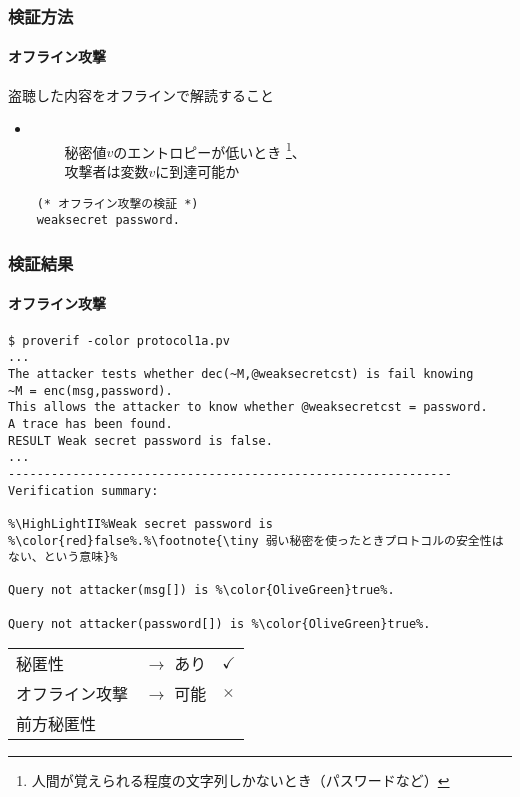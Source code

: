 \documentclass[dvipdfmx, dvipsnames, 11pt]{beamer}
\newcommand{\code}[1]{ \texttt{\detokenize{#1}} }
\newcommand{\HighLight}{\makebox[0pt][l]{\color[rgb]{1, 0.88, 0.66}\rule[-2pt]{1.0\linewidth}{8pt}}}
\newcommand{\HighLightII}{\only<2>{\HighLight}}
\begin{document}
\begin{frame}[fragile]
  \frametitle{検証方法}
  \framesubtitle{オフライン攻撃}

  盗聴した内容をオフラインで解読すること

  \vspace{2em}
  \begin{itemize}
    \item \code{weaksecret v.}
      \\~~~~ 秘密値$v$のエントロピーが低いとき
      \footnote{\tiny 人間が覚えられる程度の文字列しかないとき（パスワードなど）}、
      \\~~~~ 攻撃者は変数$v$に到達可能か
  \end{itemize}

  \vspace{2em}
  \begin{lstlisting}
    (* オフライン攻撃の検証 *)
    weaksecret password.
  \end{lstlisting}
\end{frame}

\begin{frame}[fragile]
  \frametitle{検証結果}
  \framesubtitle{オフライン攻撃}

  \begin{lstlisting}[basicstyle=\ttfamily\tiny, frame=single]
$ proverif -color protocol1a.pv
...
The attacker tests whether dec(~M,@weaksecretcst) is fail knowing
~M = enc(msg,password).
This allows the attacker to know whether @weaksecretcst = password.
A trace has been found.
RESULT Weak secret password is false.
...
--------------------------------------------------------------
Verification summary:

%\HighLightII%Weak secret password is %\color{red}false%.%\footnote{\tiny 弱い秘密を使ったときプロトコルの安全性はない、という意味}%

Query not attacker(msg[]) is %\color{OliveGreen}true%.

Query not attacker(password[]) is %\color{OliveGreen}true%.
  \end{lstlisting}

  \begin{table}
    \centering
    \begin{tabular}{lll}
      \color{gray}秘匿性 & \color{gray}$\rightarrow$ あり & \color{OliveGreen}$\checkmark$ \\
      オフライン攻撃 & $\rightarrow$ 可能 & \color{red}$\times$ \\
      \color{gray}前方秘匿性 &  &
    \end{tabular}
  \end{table}
\end{frame}
\end{document}
